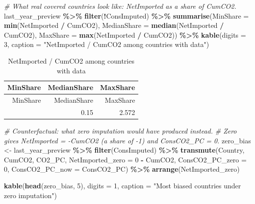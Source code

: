 \documentclass[
]{article}
\newenvironment{Shaded}{\begin{snugshade}}{\end{snugshade}}
\newcommand{\AttributeTok}[1]{\textcolor[rgb]{0.13,0.29,0.53}{#1}}
\newcommand{\CommentTok}[1]{\textcolor[rgb]{0.56,0.35,0.01}{\textit{#1}}}
\newcommand{\DecValTok}[1]{\textcolor[rgb]{0.00,0.00,0.81}{#1}}
\newcommand{\FunctionTok}[1]{\textcolor[rgb]{0.13,0.29,0.53}{\textbf{#1}}}
\newcommand{\NormalTok}[1]{#1}
\newcommand{\OtherTok}[1]{\textcolor[rgb]{0.56,0.35,0.01}{#1}}
\newcommand{\SpecialCharTok}[1]{\textcolor[rgb]{0.81,0.36,0.00}{\textbf{#1}}}
\newcommand{\StringTok}[1]{\textcolor[rgb]{0.31,0.60,0.02}{#1}}
\begin{document}
\begin{Shaded}
\begin{Highlighting}[]
\CommentTok{\# What real covered countries look like: NetImported as a share of CumCO2.}
\NormalTok{last\_year\_preview }\SpecialCharTok{\%\textgreater{}\%}
  \FunctionTok{filter}\NormalTok{(}\SpecialCharTok{!}\NormalTok{ConsImputed) }\SpecialCharTok{\%\textgreater{}\%}
  \FunctionTok{summarise}\NormalTok{(}\AttributeTok{MinShare =} \FunctionTok{min}\NormalTok{(NetImported }\SpecialCharTok{/}\NormalTok{ CumCO2),}
            \AttributeTok{MedianShare =} \FunctionTok{median}\NormalTok{(NetImported }\SpecialCharTok{/}\NormalTok{ CumCO2),}
            \AttributeTok{MaxShare =} \FunctionTok{max}\NormalTok{(NetImported }\SpecialCharTok{/}\NormalTok{ CumCO2)) }\SpecialCharTok{\%\textgreater{}\%}
  \FunctionTok{kable}\NormalTok{(}\AttributeTok{digits =} \DecValTok{3}\NormalTok{,}
        \AttributeTok{caption =} \StringTok{"NetImported / CumCO2 among countries with data"}\NormalTok{)}
\end{Highlighting}
\end{Shaded}

\begin{longtable}[]{@{}rrr@{}}
\caption{NetImported / CumCO2 among countries with data}\tabularnewline
\toprule\noalign{}
MinShare & MedianShare & MaxShare \\
\midrule\noalign{}
\endfirsthead
\toprule\noalign{}
MinShare & MedianShare & MaxShare \\
\midrule\noalign{}
\endhead
\bottomrule\noalign{}
\endlastfoot
-0.49 & 0.15 & 2.572 \\
\end{longtable}

\begin{Shaded}
\begin{Highlighting}[]
\CommentTok{\# Counterfactual: what zero imputation would have produced instead.}
\CommentTok{\# Zero gives NetImported = {-}CumCO2 (a share of {-}1) and ConsCO2\_PC = 0.}
\NormalTok{zero\_bias }\OtherTok{\textless{}{-}}\NormalTok{ last\_year\_preview }\SpecialCharTok{\%\textgreater{}\%}
  \FunctionTok{filter}\NormalTok{(ConsImputed) }\SpecialCharTok{\%\textgreater{}\%}
  \FunctionTok{transmute}\NormalTok{(Country, CumCO2, CO2\_PC,}
            \AttributeTok{NetImported\_zero =} \DecValTok{0} \SpecialCharTok{{-}}\NormalTok{ CumCO2,}
            \AttributeTok{ConsCO2\_PC\_zero =} \DecValTok{0}\NormalTok{,}
            \AttributeTok{ConsCO2\_PC\_now =}\NormalTok{ ConsCO2\_PC) }\SpecialCharTok{\%\textgreater{}\%}
  \FunctionTok{arrange}\NormalTok{(NetImported\_zero)}

\FunctionTok{kable}\NormalTok{(}\FunctionTok{head}\NormalTok{(zero\_bias, }\DecValTok{5}\NormalTok{), }\AttributeTok{digits =} \DecValTok{1}\NormalTok{,}
      \AttributeTok{caption =} \StringTok{"Most biased countries under zero imputation"}\NormalTok{)}
\end{Highlighting}
\end{Shaded}
\end{document}
